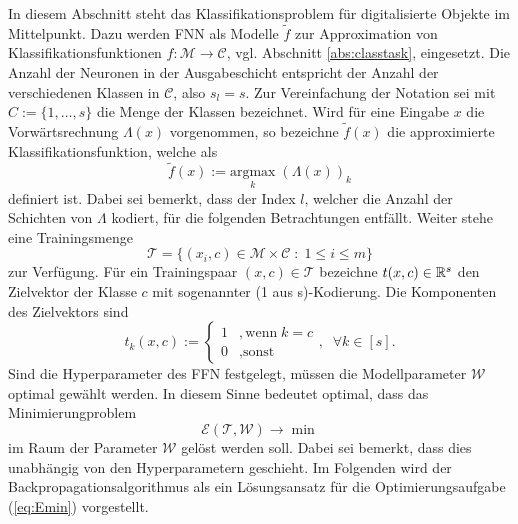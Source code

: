 In diesem Abschnitt steht das Klassifikationsproblem für digitalisierte Objekte im Mittelpunkt. Dazu werden FNN als Modelle $\tilde{f}$ zur Approximation von Klassifikationsfunktionen $f: \mathcal{M} \rightarrow \mathcal{C}$, vgl. Abschnitt \ref{abs:classtask}, eingesetzt. Die Anzahl der Neuronen in der Ausgabeschicht entspricht der Anzahl der verschiedenen Klassen in $\mathcal{C}$, also $s_l=s$. Zur Vereinfachung der Notation sei mit $C:=\{1, \ldots, s\}$ die Menge der Klassen bezeichnet. Wird für eine Eingabe $x$ die Vorwärtsrechnung $\Lambda(x)$ vorgenommen, so bezeichne $\tilde{f}(x)$ die approximierte Klassifikationsfunktion, welche als
\begin{equation*}
    \tilde{f}(x):= \underset{k}{\mathrm{argmax}} \; \left(\Lambda(x)\right)_k
\end{equation*}
definiert ist. Dabei sei bemerkt, dass der Index $l$, welcher die Anzahl der Schichten von $\Lambda$ kodiert, für die folgenden Betrachtungen entfällt.   
Weiter stehe eine Trainingsmenge 
\begin{equation*}
    \mathcal{T}= \{(x_i, c) \in \mathcal{M} \times \mathcal{C}\; : \; 1 \leq i \leq m\}  
\end{equation*}
zur Verfügung. Für ein Trainingspaar $\left(x,c\right) \in \mathcal{T}$ bezeichne $t(x,c) \in \mathbb{R}^s$ den Zielvektor der Klasse $c$ mit sogenannter (1 aus s)-Kodierung. Die Komponenten des Zielvektors sind
\begin{equation*}
    t_k(x,c):= \begin{cases}
        1 &, \text{wenn} \; k=c \\
        0 &, \text{sonst}
    \end{cases}, \; \; \forall k \in [s].
\end{equation*} 
Sind die Hyperparameter des FFN festgelegt, müssen die Modellparameter $\mathcal{W}$ optimal gewählt werden. In diesem Sinne bedeutet optimal, dass das Minimierungproblem 
\begin{equation}
    \label{eq:Emin}
    \mathcal{E}(\mathcal{T}, \mathcal{W}) \rightarrow \min
\end{equation} 
im Raum der Parameter $\mathcal{W}$ gelöst werden soll. Dabei sei bemerkt, dass dies unabhängig von den Hyperparametern geschieht. Im Folgenden wird der Backpropagationsalgorithmus als ein Lösungsansatz für die Optimierungsaufgabe (\ref{eq:Emin}) vorgestellt.  

